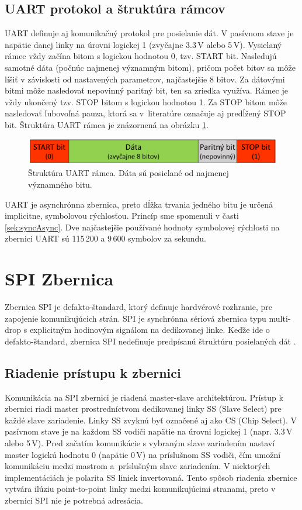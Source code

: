 \subsection{UART protokol a štruktúra rámcov}
UART definuje aj komunikačný protokol pre posielanie dát. V pasívnom stave je napätie danej linky na úrovni logickej 1 (zvyčajne 3.3\,V alebo 5\,V). Vysielaný rámec vždy začína bitom s logickou hodnotou 0, tzv. START bit.  Nasledujú samotné dáta (počnúc najmenej významným bitom), pričom počet bitov sa môže líšiť v závislosti od nastavených parametrov, najčastejšie 8 bitov. Za dátovými bitmi môže nasledovať nepovinný paritný bit, ten sa zriedka využíva. Rámec je vždy ukončený tzv. STOP bitom s logickou hodnotou 1. Za STOP bitom môže nasledovať ľubovoľná pauza, ktorá sa v~literatúre označuje aj predĺžený STOP bit. Štruktúra UART rámca je znázornená na obrázku \ref{obr:uartFrame}.

\begin{figure}
    \centerline{\includegraphics[width=1\textwidth]{images/busses/uartFrame.png}}
    \caption[Štruktúra UART rámca]{Štruktúra UART rámca. Dáta sú posielané od najmenej významného bitu.}
    \label{obr:uartFrame}
\end{figure}

UART je asynchrónna zbernica, preto dĺžka trvania jedného bitu je určená implicitne, symbolovou rýchlosťou. Princíp sme spomenuli v časti \ref{sek:syncAsync}. Dve najčastejšie používané hodnoty symbolovej rýchlosti na zbernici UART sú 115\,200 a 9\,600 symbolov za sekundu.

\section{SPI Zbernica}
Zbernica SPI je defakto-štandard, ktorý definuje hardvérové rozhranie, pre zapojenie komunikujúcich strán. SPI je synchrónna sériová zbernica typu multi-drop s explicitným hodinovým signálom na dedikovanej linke. Keďže ide o defakto-štandard, zbernica SPI nedefinuje predpísanú štruktúru posielaných dát \cite{spiBus}.

\subsection{Riadenie prístupu k zbernici}
Komunikácia na SPI zbernici je riadená master-slave architektúrou. Prístup k zbernici riadi master prostredníctvom dedikovanej linky SS (Slave Select) pre každé slave zariadenie. Linky SS zvyknú byť označené aj ako CS (Chip Select). V pasívnom stave je na každom SS vodiči napätie na úrovni logickej 1 (napr. 3.3\,V alebo 5\,V). Pred začatím komunikácie s vybraným slave zariadením nastaví master logickú hodnotu 0 (napätie 0\,V) na príslušnom SS vodiči, čím umožní komunikáciu medzi mastrom a~príslušným slave zariadením. V niektorých implementáciách je polarita SS liniek invertovaná. Tento spôsob riadenia zbernice vytvára ilúziu point-to-point linky medzi komunikujúcimi stranami, preto v zbernici SPI nie je potrebná adresácia.

